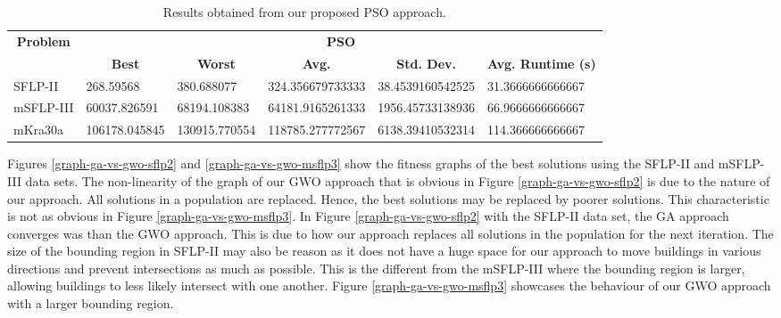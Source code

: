 \begin{table}[h!]
\begin{adjustwidth}{-1.18in}{}
\centering
\begin{tabular}{|l|l|l|l|l|l|}
	\hline
	\multicolumn{1}{|c|}{\multirow{2}{*}{\textbf{Problem}}} & \multicolumn{5}{c|}{\textbf{PSO}} \\ \cline{2-6} 
	\multicolumn{1}{|c|}{}                                  & \multicolumn{1}{c|}{\textbf{Best}} & \multicolumn{1}{c|}{\textbf{Worst}} & \multicolumn{1}{c|}{\textbf{Avg.}} & \multicolumn{1}{c|}{\textbf{Std. Dev.}} & \multicolumn{1}{c|}{\textbf{Avg. Runtime (s)}} \\ \hline
	SFLP-II                                                 & 268.59568                                  & 380.688077                                   &
	324.356679733333							&
	38.4539160542525							&
	31.3666666666667							\\ \hline
	mSFLP-III                                               & 60037.826591                                & 68194.108383                                 &
	64181.9165261333					          &
	1956.45733138936						&
	66.9666666666667						\\ \hline
	mKra30a                                               & 106178.045845                                & 130915.770554                                 &
	118785.277772567							&
	6138.39410532314							&
	114.366666666667						\\ \hline
\end{tabular}
\end{adjustwidth}
\caption{Results obtained from our proposed PSO approach.}
\label{approach-pso-results}
\end{table}


Figures \ref{graph-ga-vs-gwo-sflp2} and \ref{graph-ga-vs-gwo-msflp3} show the fitness graphs of the best solutions using the SFLP-II and mSFLP-III data sets. The non-linearity of the graph of our GWO approach that is obvious in Figure \ref{graph-ga-vs-gwo-sflp2} is due to the nature of our approach. All solutions in a population are replaced. Hence, the best solutions may be replaced by poorer solutions. This characteristic is not as obvious in Figure \ref{graph-ga-vs-gwo-msflp3}. In Figure \ref{graph-ga-vs-gwo-sflp2} with the SFLP-II data set, the GA approach converges was than the GWO approach. This is due to how our approach replaces all solutions in the population for the next iteration. The size of the bounding region in SFLP-II may also be reason as it does not have a huge space for our approach to move buildings in various directions and prevent intersections as much as possible. This is the different from the mSFLP-III where the bounding region is larger, allowing buildings to less likely intersect with one another. Figure \ref{graph-ga-vs-gwo-msflp3} showcases the behaviour of our GWO approach with a larger bounding region.

